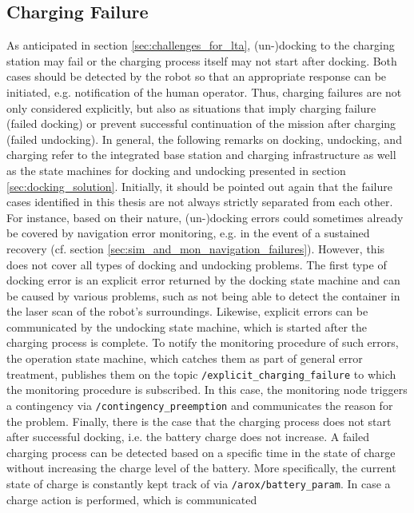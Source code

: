 \documentclass[english, master, utf8]{base/thesis_KBS}
\newcommand{\code}[1]{\colorbox{light-gray}{\texttt{#1}}}
\begin{document}
\subsection{Charging Failure}
\label{sec:sim_and_mon_charging_failures}

As anticipated in section \ref{sec:challenges_for_lta}, (un-)docking to the charging station may fail or the charging process itself may not start after docking. Both cases should be
detected by the robot so that an appropriate response can be initiated, e.g. notification of the human operator. Thus, charging failures are not only considered explicitly, but also
as situations that imply charging failure (failed docking) or prevent successful continuation of the mission after charging (failed undocking). In general, the following remarks on docking,
undocking, and charging refer to the integrated base station and charging infrastructure as well as the state machines for docking and undocking presented in section
\ref{sec:docking_solution}. Initially, it should be pointed out again that the failure cases identified in this thesis are not always strictly separated from each other. For instance,
based on their nature, (un-)docking errors could sometimes already be covered by navigation error monitoring, e.g. in the event of a sustained recovery (cf. section \ref{sec:sim_and_mon_navigation_failures}).
However, this does not cover all types of docking and undocking problems. The first type of docking error is an explicit error returned by the docking state machine and can be caused
by various problems, such as not being able to detect the container in the laser scan of the robot's surroundings. Likewise, explicit errors can be communicated by the undocking state
machine, which is started after the charging process is complete. To notify the monitoring procedure of such errors, the operation state machine, which catches them as part of general
error treatment, publishes them on the topic \code{/explicit\_charging\_failure} to which the monitoring procedure is subscribed. In this case, the monitoring node triggers a
contingency via \code{/contingency\_preemption} and communicates the reason for the problem. Finally, there is the case that the charging process does not start after successful
docking, i.e. the battery charge does not increase. A failed charging process can be detected based on a specific time in the state of charge without increasing the charge level
of the battery. More specifically, the current state of charge is constantly kept track of via \code{/arox/battery\_param}. In case a charge action is performed, which is communicated
\end{document}
